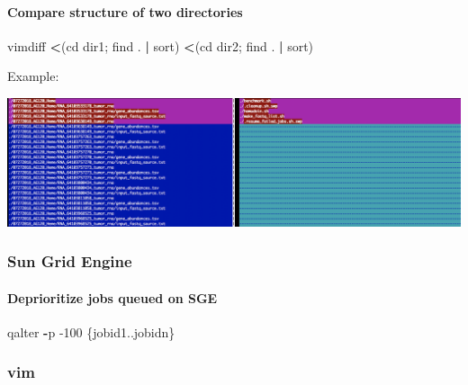 \documentclass[openany]{article}
\newenvironment{Shaded}{\begin{snugshade}}{\end{snugshade}}
\newcommand{\DecValTok}[1]{\textcolor[rgb]{0.00,0.00,0.81}{#1}}
\newcommand{\NormalTok}[1]{#1}
\newcommand{\OperatorTok}[1]{\textcolor[rgb]{0.81,0.36,0.00}{\textbf{#1}}}
\newcommand{\StringTok}[1]{\textcolor[rgb]{0.31,0.60,0.02}{#1}}
\let\oldparagraph\paragraph
\renewcommand{\paragraph}[1]{\oldparagraph{#1}\mbox{}}
\begin{document}
\hypertarget{compare-structure-of-two-directories}{%
\paragraph{Compare structure of two directories}\label{compare-structure-of-two-directories}}

\begin{Shaded}
\begin{Highlighting}[]
\NormalTok{vimdiff }\OperatorTok{<}\NormalTok{(cd dir1; find . }\OperatorTok{|}\StringTok{ }\NormalTok{sort) }\OperatorTok{<}\NormalTok{(cd dir2; find . }\OperatorTok{|}\StringTok{ }\NormalTok{sort)}
\end{Highlighting}
\end{Shaded}

Example:

\includegraphics[width=1.3\linewidth]{images/vimdiff}

\hypertarget{sun-grid-engine}{%
\subsubsection{Sun Grid Engine}\label{sun-grid-engine}}

\hypertarget{deprioritize-jobs-queued-on-sge}{%
\paragraph{Deprioritize jobs queued on SGE}\label{deprioritize-jobs-queued-on-sge}}

\begin{Shaded}
\begin{Highlighting}[]
\NormalTok{qalter }\OperatorTok{-}\NormalTok{p }\DecValTok{-100}\NormalTok{ \{jobid1..jobidn\}}
\end{Highlighting}
\end{Shaded}

\hypertarget{vim}{%
\subsubsection{vim}\label{vim}}
\end{document}
